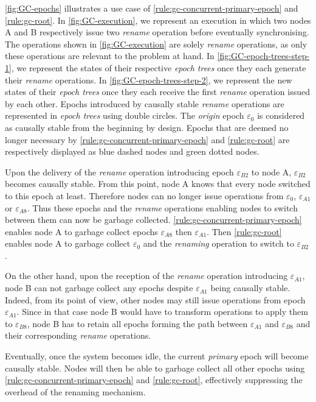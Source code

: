 \documentclass[10pt,journal,compsoc]{IEEEtran}
\newcommand{\epoch}[1]{$\varepsilon_{#1}$}
\begin{document}
\autoref{fig:GC-epochs} illustrates a use case of \autoref{rule:gc-concurrent-primary-epoch} and \autoref{rule:gc-root}.
In \autoref{fig:GC-execution}, we represent an execution in which two nodes A and B respectively issue two \emph{rename} operation before eventually synchronising.
The operations shown in \autoref{fig:GC-execution} are solely \emph{rename} operations, as only these operations are relevant to the problem at hand.
In \autoref{fig:GC-epoch-trees-step-1}, we represent the states of their respective \emph{epoch trees} once they each generate their \emph{rename} operations.
In \autoref{fig:GC-epoch-trees-step-2}, we represent the new states of their \emph{epoch trees} once they each receive the first \emph{rename} operation issued by each other.
Epochs introduced by causally stable \emph{rename} operations are represented in \emph{epoch trees} using double circles.
The \emph{origin} epoch \epoch{0} is considered as causally stable from the beginning by design.
Epochs that are deemed no longer necessary by \autoref{rule:gc-concurrent-primary-epoch} and \autoref{rule:gc-root} are respectively displayed as blue dashed nodes and green dotted nodes.

Upon the delivery of the \emph{rename} operation introducing epoch \epoch{B2} to node A, \epoch{B2} becomes causally stable.
From this point, node A knows that every node switched to this epoch at least.
Therefore nodes can no longer issue operations from \epoch{0}, \epoch{A1} or \epoch{A8}.
Thus these epochs and the \emph{rename} operations enabling nodes to switch between them can now be garbage collected.
\autoref{rule:gc-concurrent-primary-epoch} enables node A to garbage collect epochs \epoch{A8} then \epoch{A1}.
Then \autoref{rule:gc-root} enables node A to garbage collect \epoch{0} and the \emph{renaming} operation to switch to \epoch{B2}.

On the other hand, upon the reception of the \emph{rename} operation introducing \epoch{A1}, node B can not garbage collect any epochs despite \epoch{A1} being causally stable.
Indeed, from its point of view, other nodes may still issue operations from epoch \epoch{A1}.
Since in that case node B would have to transform operations to apply them to \epoch{B8}, node B has to retain all epochs forming the path between \epoch{A1} and \epoch{B8} and their corresponding \emph{rename} operations.

Eventually, once the system becomes idle, the current \emph{primary} epoch will become causally stable.
Nodes will then be able to garbage collect all other epochs using \autoref{rule:gc-concurrent-primary-epoch} and \autoref{rule:gc-root}, effectively suppressing the overhead of the renaming mechanism.
\end{document}
